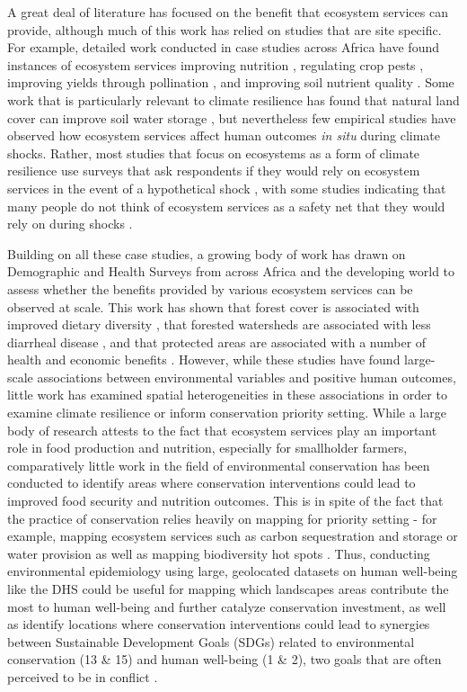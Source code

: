 \documentclass[titlepage]{article}
\begin{document}
A great deal of literature has focused on the benefit that ecosystem services can provide, although much of this work has relied on studies that are site specific.  For example, detailed work conducted in case studies across Africa have found instances of ecosystem services improving nutrition \citep{Golden2011}, regulating crop pests \citep{Girma2000}, improving yields through pollination \citep{Gemmill-Herren2008, Munyuli2012}, and improving soil nutrient quality \citep{Sileshi2012, Boffa2000, Siriri2009}.  Some work that is particularly relevant to climate resilience has found that natural land cover can improve soil water storage \citep{Siriri2013, Lott2009}, but nevertheless few empirical studies have observed how ecosystem services affect human outcomes \textit{in situ} during climate shocks.  Rather, most studies that focus on ecosystems as a form of climate resilience use surveys that ask respondents if they would rely on ecosystem services in the event of a hypothetical shock \citep{Robledo2012}, with some studies indicating that many people do not think of ecosystem services as a safety net that they would rely on during shocks \citep{Wunder2014}.

Building on all these case studies, a growing body of work has drawn on Demographic and Health Surveys from across Africa and the developing world to assess whether the benefits provided by various ecosystem services can be observed at scale.  This work has shown that forest cover is associated with improved dietary diversity \citep{Ickowitz2014, Rasolofoson2018}, that forested watersheds are associated with less diarrheal disease \citep{Herrera2017}, and that protected areas are associated with a number of health and economic benefits \citep{naidoo2019evaluating}.  However, while these studies have found large-scale associations between environmental variables and positive human outcomes, little work has examined spatial heterogeneities in these associations in order to examine climate resilience or inform conservation priority setting.
While a large body of research attests to the fact that ecosystem services play an important role in food production and nutrition, especially for smallholder farmers, comparatively little work in the field of environmental conservation has been conducted to identify areas where conservation interventions could lead to improved food security and nutrition outcomes.  This is in spite of the fact that the practice of conservation relies heavily on mapping for priority setting - for example, mapping ecosystem services such as carbon sequestration and storage \citep{Kim2016} or water provision \citep{immerzeel2020importance} as well as mapping biodiversity hot spots \citep{holland2012conservation}.  Thus, conducting environmental epidemiology using large, geolocated datasets on human well-being like the DHS could be useful for mapping which landscapes areas contribute the most to human well-being and further catalyze conservation investment, as well as identify locations where conservation interventions could lead to synergies between Sustainable Development Goals (SDGs) related to environmental conservation (13 \& 15) and human well-being (1 \& 2), two goals that are often perceived to be in conflict \citep{moore2016improving, mcshane2011hard}.
\end{document}
